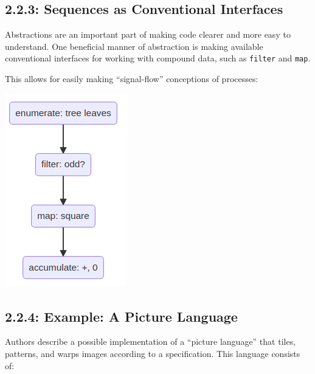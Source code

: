 \documentclass[final,fleqn,titlepage]{article}
\begin{document}
\subsection{2.2.3: Sequences as Conventional Interfaces}
\label{sec:org20b95c0}
Abstractions are an important part of making code clearer and more easy to
understand. One beneficial manner of abstraction is making available
conventional interfaces for working with compound data, such as \texttt{filter} and
\texttt{map}.

This allows for easily making ``signal-flow'' conceptions of processes:

\begin{center}
\includegraphics[width=.9\linewidth]{2/fig/t_2-2-3.png}
\end{center}

\subsection{2.2.4: Example: A Picture Language}
\label{sec:org7f818fd}
Authors describe a possible implementation of a ``picture language'' that tiles,
patterns, and warps images according to a specification. This language consists
of:
\end{document}
